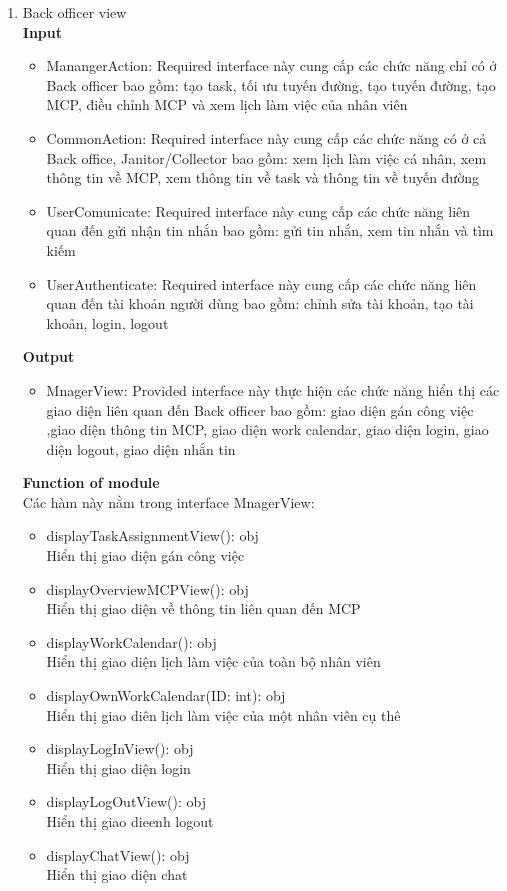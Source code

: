 \documentclass[a4paper]{article}
\begin{document}
     \begin{enumerate}
         \item Back officer view \\
 \textbf{Input}
 \begin{itemize}
     \item ManangerAction: Required interface này cung cấp các chức năng chỉ có ở Back officer bao gồm: tạo task, tối ưu tuyến đường, tạo tuyến đường, tạo MCP, điều chỉnh MCP và xem lịch làm việc của nhân viên
     \item CommonAction: Required interface này cung cấp các chức năng có ở cả Back office, Janitor/Collector bao gồm: xem lịch làm việc cá nhân, xem thông tin về MCP, xem thông tin về task và thông tin về tuyến đường
     \item UserComunicate: Required interface này cung cấp các chức năng liên quan đến gửi nhận tin nhắn bao gồm: gửi tin nhắn, xem tin nhắn và tìm kiếm
     \item UserAuthenticate:  Required interface này cung cấp các chức năng liên quan đến tài khoản người dùng bao gồm: chỉnh sửa tài khoản, tạo tài khoản, login, logout
 \end{itemize}
  \textbf{Output}
   \begin{itemize}
     \item MnagerView: Provided interface này thực hiện các chức năng hiển thị các giao diện liên quan đến Back officer bao gồm: giao diện gán công việc ,giao diện thông tin MCP, giao diện work calendar, giao diện login, giao diện logout, giao diện nhắn tin
 \end{itemize}
  \textbf{Function of module}\\
  Các hàm này nằm trong interface MnagerView:
     \begin{itemize}
     \item displayTaskAssignmentView(): obj \\
     Hiển thị giao diện gán công việc
\item displayOverviewMCPView(): obj\\
Hiển thị giao diện về thông tin liên quan đến MCP
\item displayWorkCalendar(): obj \\
Hiển thị giao diện lịch làm việc của toàn bộ nhân viên
\item displayOwnWorkCalendar(ID: int): obj \\
Hiển thị giao diên lịch làm việc của một nhân viên cụ thê
\item displayLogInView(): obj\\
Hiển thị giao diện login
\item displayLogOutView(): obj\\
Hiển thị giao dieenh logout
\item displayChatView(): obj\\
Hiển thị giao diện chat
 \end{itemize}
 

\end{enumerate}
\end{document}
